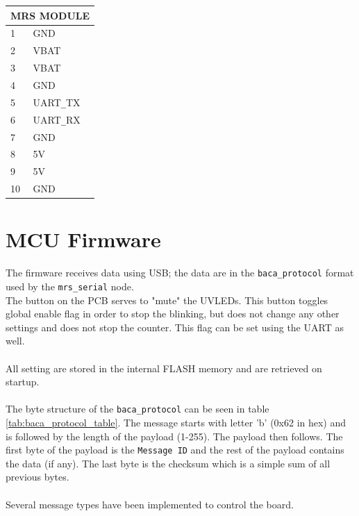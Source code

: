 \documentclass[12pt, a4paper]{article}
\begin{document}
\begin{center}
\begin{minipage}[t][3.5cm][t]{0.24\textwidth}
\centering
\begin{tabular}{|l|l|}
\hline
\multicolumn{2}{|p{3cm}|}{\centering\textbf{MRS MODULE}} \\ \hline
1               & GND         \\ \hline
2               & VBAT        \\ \hline
3               & VBAT        \\ \hline
4               & GND         \\ \hline
5               & UART\verb|_|TX     \\ \hline
6               & UART\verb|_|RX     \\ \hline
7               & GND         \\ \hline
8               & 5V          \\ \hline
9               & 5V          \\ \hline
10              & GND         \\ \hline
\end{tabular}
\end{minipage}
\end{center}

\pagebreak
\section{MCU Firmware}

The firmware receives data using USB; the data are in the \verb|baca_protocol| format used by the \verb|mrs_serial| node.\\
The button on the PCB serves to "mute" the UVLEDs. This button toggles global enable flag in order to stop the blinking, but does not change any other settings and does not stop the counter. This flag can be set using the UART as well.\\
\\
All setting are stored in the internal FLASH memory and are retrieved on startup.\\
\\
The byte structure of the \verb|baca_protocol| can be seen in table \ref{tab:baca_protocol_table}.
The message starts with letter 'b' (0x62 in hex) and is followed by the length of the payload (1-255).
The payload then follows. The first byte of the payload is the \verb|Message ID| and the rest of the payload contains the data (if any). The last byte is the checksum which is a simple sum of all previous bytes.\\
\\
Several message types have been implemented to control the board.
\end{document}
